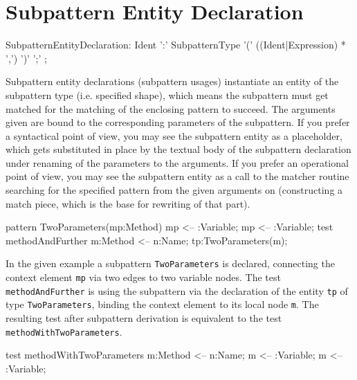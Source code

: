 \section{Subpattern Entity Declaration}

\begin{rail}  
  SubpatternEntityDeclaration: 
    Ident ':' SubpatternType '(' ((Ident|Expression) * ',') ')' ';' ;
\end{rail}

Subpattern entity declarations (subpattern usages) instantiate an entity of the subpattern type (i.e. specified shape), which means the subpattern must get matched for the matching of the enclosing pattern to succeed.
The arguments given are bound to the corresponding parameters of the subpattern.
If you prefer a syntactical point of view, you may see the subpattern entity as a placeholder, which gets substituted in place by the textual body of the subpattern declaration under renaming of the parameters to the arguments.
If you prefer an operational point of view, you may see the subpattern entity as a call to the matcher routine searching for the specified pattern from the given arguments on (constructing a match piece, which is the base for rewriting of that part).


\begin{example}
  \begin{grgen}
pattern TwoParameters(mp:Method)
{
  mp <-- :Variable;
  mp <-- :Variable;
}
test methodAndFurther
{
  m:Method <-- n:Name;
  tp:TwoParameters(m);
}
  \end{grgen}

  In the given example a subpattern \texttt{TwoParameters} is declared, connecting the context element \texttt{mp} via two edges to two variable nodes.
  The test \texttt{methodAndFurther} is using the subpattern via the declaration of the entity \texttt{tp} of type \texttt{TwoParameters}, binding the context element to its local node \texttt{m}.
  The resulting test after subpattern derivation is equivalent to the test \texttt{methodWithTwoParameters}.

  \begin{grgen}
test methodWithTwoParameters
{
  m:Method <-- n:Name;
  m <-- :Variable;
  m <-- :Variable;
}
  \end{grgen}
\end{example}

